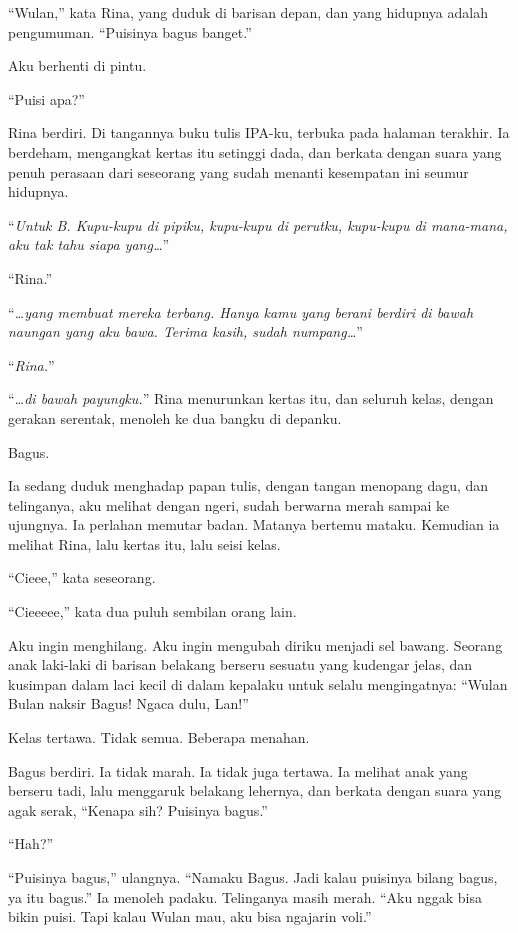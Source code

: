 \documentclass[11pt,twoside,openany]{book}
\begin{document}
``Wulan,'' kata Rina, yang duduk di barisan depan, dan yang hidupnya adalah pengumuman. ``Puisinya bagus banget.''

Aku berhenti di pintu.

``Puisi apa?''

Rina berdiri. Di tangannya buku tulis IPA-ku, terbuka pada halaman terakhir. Ia berdeham, mengangkat kertas itu setinggi dada, dan berkata dengan suara yang penuh perasaan dari seseorang yang sudah menanti kesempatan ini seumur hidupnya.

``\emph{Untuk B. Kupu-kupu di pipiku, kupu-kupu di perutku, kupu-kupu di mana-mana, aku tak tahu siapa yang\ldots{}}''

``Rina.''

``\emph{\ldots yang membuat mereka terbang. Hanya kamu yang berani berdiri di bawah naungan yang aku bawa. Terima kasih, sudah numpang\ldots{}}''

``\emph{Rina.}''

``\emph{\ldots di bawah payungku.}'' Rina menurunkan kertas itu, dan seluruh kelas, dengan gerakan serentak, menoleh ke dua bangku di depanku.

Bagus.

Ia sedang duduk menghadap papan tulis, dengan tangan menopang dagu, dan telinganya, aku melihat dengan ngeri, sudah berwarna merah sampai ke ujungnya. Ia perlahan memutar badan. Matanya bertemu mataku. Kemudian ia melihat Rina, lalu kertas itu, lalu seisi kelas.

``Cieee,'' kata seseorang.

``Cieeeee,'' kata dua puluh sembilan orang lain.

Aku ingin menghilang. Aku ingin mengubah diriku menjadi sel bawang. Seorang anak laki-laki di barisan belakang berseru sesuatu yang kudengar jelas, dan kusimpan dalam laci kecil di dalam kepalaku untuk selalu mengingatnya: ``Wulan Bulan naksir Bagus! Ngaca dulu, Lan!''

Kelas tertawa. Tidak semua. Beberapa menahan.

Bagus berdiri. Ia tidak marah. Ia tidak juga tertawa. Ia melihat anak yang berseru tadi, lalu menggaruk belakang lehernya, dan berkata dengan suara yang agak serak, ``Kenapa sih? Puisinya bagus.''

``Hah?''

``Puisinya bagus,'' ulangnya. ``Namaku Bagus. Jadi kalau puisinya bilang bagus, ya itu bagus.'' Ia menoleh padaku. Telinganya masih merah. ``Aku nggak bisa bikin puisi. Tapi kalau Wulan mau, aku bisa ngajarin voli.''
\end{document}
